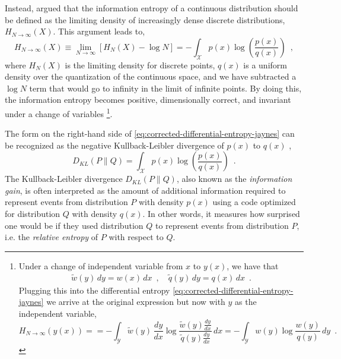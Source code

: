 Instead, \textcite{jaynes_information_1957,jaynes_prior_1968} argued that the information entropy of a continuous distribution should be defined as the limiting density of increasingly dense discrete distributions, $H_{N\rightarrow\infty}(X)$. This argument leads to,
%
\begin{equation} \label{eq:corrected-differential-entropy-jaynes}
    H_{N\rightarrow\infty}(X) \equiv \lim_{N\rightarrow\infty} [H_{N}(X) - \log N] = - \int_\mathcal{X} p(x) \log \left(\frac{p(x)}{q(x)}\right) \enspace ,
\end{equation}
%
where $H_N(X)$ is the limiting density for discrete points, $q(x)$ is a uniform density over the quantization of the continuous space, and we have subtracted a $\log N$ term that would go to infinity in the limit of infinite points.
By doing this, the information entropy becomes positive, dimensionally correct, and invariant under a change of variables%
\footnote{\label{fn:change-of-variables-invariance-of-corrected-differential-entropy}
    Under a change of independent variable from $x$ to $y(x)$, we have that
    \begin{align*}
        \widetilde{w}(y)\,dy = w(x)\,dx \enspace , \quad
        \widetilde{q}(y)\,dy = q(x)\,dx \enspace .
    \end{align*}
    Plugging this into the differential entropy \cref{eq:corrected-differential-entropy-jaynes} we arrive at the original expression but now with $y$ as the independent variable,
    \begin{equation*}
        H_{N\rightarrow\infty}(y(x)) =  = - \int_\mathcal{Y} \widetilde{w}(y)\,\frac{dy}{dx} \log \frac{\widetilde{w}(y)\frac{dy}{dx}}{\widetilde{q}(y)\frac{dy}{dx}} \, dx = - \int_\mathcal{Y} w(y) \log \frac{w(y)}{q(y)} \, dy \enspace .
    \end{equation*}
}.

The form on the right-hand side of \cref{eq:corrected-differential-entropy-jaynes} can be recognized as the negative Kullback-Leibler divergence of $p(x)$ to $q(x)$ \cite{kullback_information_1959},
%
\begin{equation} \label{eq:kullback-leibler-divergence}
    D_{KL}(P\parallel Q) = \int_\mathcal{X} p(x) \log \left(\frac{p(x)}{q(x)}\right) \enspace .
\end{equation}
%
The Kullback-Leibler divergence $D_{KL}(P\parallel Q)$, also known as the \emph{information gain}, is often interpreted as the amount of additional information required to represent events from distribution $P$ with density $p(x)$ using a code optimized for distribution $Q$ with density $q(x)$. In other words, it measures how surprised one would be if they used distribution $Q$ to represent events from distribution $P$, i.e. the \emph{relative entropy} of $P$ with respect to $Q$.

